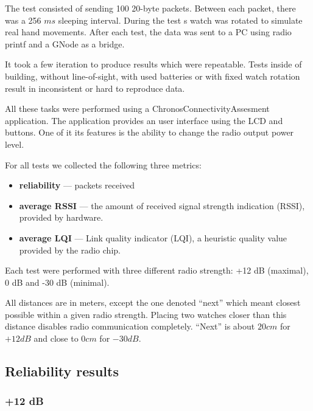 The test consisted of sending 100 20-byte packets.
Between each packet, there was a 256 $ ms $ sleeping interval.
During the test s watch was rotated to simulate real hand movements.
After each test, the data was sent to a PC using radio printf and a GNode as a bridge.

It took a few iteration to produce results which were repeatable.
Tests inside of building, without line-of-sight, with used batteries or with fixed watch rotation result in inconsistent or hard to reproduce data.

All these tasks were performed using a ChronosConnectivityAssesment application.
The application provides an user interface using the LCD and buttons.
One of it its features is the ability to change the radio output power level.

For all tests we collected the following three metrics:
\begin{itemize}
  \item \textbf{reliability} --- packets received
  \item \textbf{average RSSI} --- the amount of received signal strength indication (RSSI), provided by hardware.
  \item \textbf{average LQI} --- Link quality indicator (LQI), a heuristic quality value provided by the radio chip.
\end{itemize}

Each test were performed with three different radio strength: +12 dB (maximal), 0 dB and -30 dB (minimal).

All distances are in meters, except the one denoted ``next''  which meant closest possible within a given radio strength.
Placing two watches closer than this distance disables radio communication completely.
``Next'' is about $20 cm$ for $+12 dB$ and close to $0 cm$ for $- 30 dB$.



\subsection{Reliability results}

\subsubsection{+12 dB}

